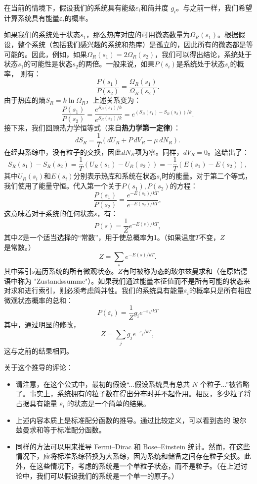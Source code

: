 在当前的情境下，假设我们的系统具有能级\( \varepsilon_i \)和简并度 \( g_i \)。与之前一样，我们希望计算系统具有能量\( \varepsilon_i \)的概率。

如果我们的系统处于状态\(s_1\)，那么热库对应的可用微态数量为\(\Omega_R(s_1)\)。根据假设，整个系统（包括我们感兴趣的系统和热库）是孤立的，因此所有的微态都是等可能的。因此，例如，如果\(\Omega_R(s_1) = 2 \Omega_R(s_2)\)，我们可以得出结论，系统处于状态\(s_1 \)的可能性是状态\(s_2\)的两倍。一般来说，如果\(P(s_i)\)是系统处于状态\(s_i\)的概率， 则有：
\[
\frac{P(s_1)}{P(s_2)} = \frac{\Omega_R(s_1)}{\Omega_R(s_2)}.~
\]
由于热库的熵\( S_R = k \ln \Omega_R \)，上述关系变为：
\[
\frac{P(s_1)}{P(s_2)} = \frac{e^{S_R(s_1)/k}}{e^{S_R(s_2)/k}} = e^{(S_R(s_1) - S_R(s_2))/k}.~
\]
接下来，我们回顾热力学恒等式（来自\textbf{热力学第一定律}）：
\[
dS_R = \frac{1}{T}(dU_R + P\,dV_R - \mu\,dN_R).~
\]
在经典系综中，没有粒子的交换，因此\( dN_R \)项为零。同样，\( dV_R = 0 \)。这给出了：
\[
S_R(s_1) - S_R(s_2) = \frac{1}{T} \left( U_R(s_1) - U_R(s_2) \right) = - \frac{1}{T} \left( E(s_1) - E(s_2) \right),~
\]
其中\( U_R(s_i) \)和\( E(s_i) \)分别表示热库和系统在状态\( s_i \)时的能量。对于第二个等式，我们使用了能量守恒。代入第一个关于\( P(s_1), P(s_2) \)的方程：
\[
\frac{P(s_1)}{P(s_2)} = \frac{e^{-E(s_1)/kT}}{e^{-E(s_2)/kT}},~
\]
这意味着对于系统的任何状态\( s \)，有：
\[
P(s) = \frac{1}{Z} e^{-E(s)/kT},~
\]
其中\( Z \)是一个适当选择的“常数”，用于使总概率为1。（如果温度\( T \)不变，\( Z \)是常数。）
\[
Z = \sum_s e^{-E(s)/kT}.~
\]
其中索引\( s \)遍历系统的所有微观状态。\( Z \)有时被称为态的玻尔兹曼求和（在原始德语中称为 "Zustandssumme"）。如果我们通过能量本征值而不是所有可能的状态来对求和进行索引，则必须考虑简并性。我们的系统具有能量\( \varepsilon_i \)的概率只是所有相应微观状态概率的总和：
\[
P(\varepsilon_i) = \frac{1}{Z} g_i e^{-\varepsilon_i / kT}~
\]
其中，通过明显的修改，
\[
Z = \sum_j g_j e^{-\varepsilon_j / kT},~
\]
这与之前的结果相同。

关于这个推导的评论：
\begin{itemize}
\item 请注意，在这个公式中，最初的假设“...假设系统具有总共 \( N \) 个粒子...”被省略了。事实上，系统拥有的粒子数在得出分布时并不起作用。相反，多少粒子将占据具有能量 \( \varepsilon_i \) 的状态是一个简单的结果。
\item 上述内容本质上是标准配分函数的推导。通过比较定义，可以看到态的 玻尔兹曼求和等于标准配分函数。
\item 同样的方法可以用来推导 Fermi–Dirac 和 Bose–Einstein 统计。然而，在这些情况下，应将标准系综替换为大系综，因为系统和储备之间存在粒子交换。此外，在这些情况下，考虑的系统是一个单粒子状态，而不是粒子。（在上述讨论中，我们可以假设我们的系统是一个单一的原子。）
\end{itemize}